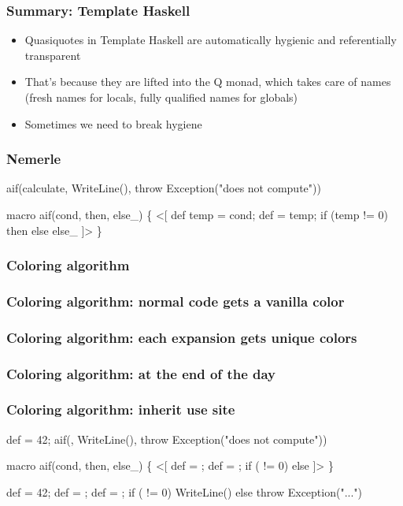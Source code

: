 \documentclass[hyperref={bookmarks=false}]{beamer}
\begin{document}
\begin{frame}[fragile]
\frametitle{Summary: Template Haskell}
\begin{itemize}
\item Quasiquotes in Template Haskell are automatically hygienic and referentially transparent
\item That's because they are lifted into the Q monad, which takes care of names (fresh names for locals,
fully qualified names for globals)
\item Sometimes we need to break hygiene
\end{itemize}
\end{frame}

\begin{frame}[fragile]
\frametitle{Nemerle}
\begin{semiverbatim}
aif(calculate,
  WriteLine(),
  throw Exception("does not compute"))

macro aif(cond, then, else_) \{
  <[
    def temp = {\textdollar}cond;
    def  = temp;
    if (temp != 0) {\textdollar}then else {\textdollar}else_
  ]>
\}


\end{semiverbatim}
\end{frame}

\begin{frame}[fragile]
\frametitle<1>{Coloring algorithm}
\frametitle<2>{Coloring algorithm: normal code gets a vanilla color}
\frametitle<3>{Coloring algorithm: each expansion gets unique colors}
\frametitle<4>{Coloring algorithm: at the end of the day}
\frametitle<5>{Coloring algorithm: inherit use site}
\begin{semiverbatim}
def  = 42;                 
aif(,
  WriteLine(),
  throw Exception("does not compute"))

macro aif(cond, then, else_) \{      
  <[
    def  = ;
    def  = ;
    if ( != 0)  else 
  ]>
\}

def  = 42;                 
def  = ;
def  = ;
if ( != 0) WriteLine() else throw Exception("...")
\end{semiverbatim}
\end{frame}
\end{document}

